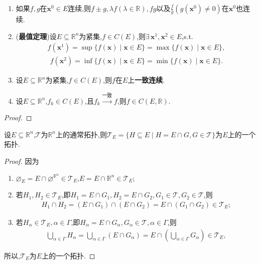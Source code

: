 \documentclass[../../main.tex]{subfiles}%
\begin{document}
\begin{theorem}
\begin{enumerate}[(1)]
\item 如果$f,g$在$\boldsymbol{x}^0\in E$连续,则$f\pm g,\lambda f(\lambda\in\mathbb{R}),fg$以及$\frac{f}{g}(g(\boldsymbol{x}^0)\neq0)$在$\boldsymbol{x}^0$也连续.

\item (\textbf{最值定理})设$E\subseteq\mathbb{R}^n$为紧集,$f\in C(E)$,则$\exists\,\boldsymbol{x}^1,\boldsymbol{x}^2\in E$,s.t.
\begin{align*}
f(\boldsymbol{x}^1)=\sup\{f(\boldsymbol{x})\mid \boldsymbol{x}\in E\}=\max\{f(\boldsymbol{x})\mid \boldsymbol{x}\in E\},
\end{align*}
\begin{align*}
f(\boldsymbol{x}^2)=\inf\{f(\boldsymbol{x})\mid \boldsymbol{x}\in E\}=\min\{f(\boldsymbol{x})\mid \boldsymbol{x}\in E\}.
\end{align*}
\item 设$E\subseteq\mathbb{R}^n$为紧集,$f\in C(E)$,则$f$在$E$上\textbf{一致连续}.

\item 设$E\subseteq\mathbb{R}^n$,$f_k\in C(E)$,且$f_k\stackrel{\text{一致}}{\to}f$,则$f\in C(E,\mathbb{R})$.
\end{enumerate}
\end{theorem}
\begin{proof}

\end{proof}

\begin{lemma}\label{lemma:实变函数--引理1.4.8}
设$E\subseteq\mathbb{R}^n$,$\mathscr{T}$为$\mathbb{R}^n$上的通常拓扑,则$\mathscr{T}_E=\{H\subseteq E\mid H=E\cap G,G\in\mathscr{T}\}$为$E$上的一个拓扑.
\end{lemma}
\begin{proof}
因为
\begin{enumerate}[(1)]
\item $\varnothing_E=E\cap\varnothing^{\mathbb{R}^n}\in\mathscr{T}_E$,$E=E\cap\mathbb{R}^n\in\mathscr{T}_E$;
\item 若$H_1,H_2\in\mathscr{T}_E$,即$H_1=E\cap G_1,H_2=E\cap G_2,G_1\in\mathscr{T},G_2\in\mathscr{T}$,则
\begin{align*}
H_1\cap H_2=(E\cap G_1)\cap(E\cap G_2)=E\cap(G_1\cap G_2)\in\mathscr{T}_E;
\end{align*}
\item 若$H_{\alpha}\in\mathscr{T}_E,\alpha\in\Gamma$,即$H_{\alpha}=E\cap G_{\alpha},G_{\alpha}\in\mathscr{T},\alpha\in\Gamma$,则
\begin{align*}
\bigcup_{\alpha\in\Gamma}H_{\alpha}=\bigcup_{\alpha\in\Gamma}(E\cap G_{\alpha})=E\cap\left(\bigcup_{\alpha\in\Gamma}G_{\alpha}\right)\in\mathscr{T}_E,
\end{align*}
\end{enumerate}
所以,$\mathscr{T}_E$为$E$上的一个拓扑.
\end{proof}
\end{document}
